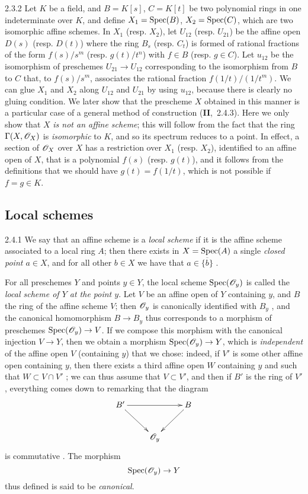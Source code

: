 \documentclass{book}
\begin{document}
\begin{env}[Example]{2.3.2}
\label{exm-1.2.3.2}
Let $K$ be a field, and $B=K[s]$, $C=K[t]$ be two polynomial rings in one indeterminate over $K$,
and define $X_1={\mathop{\mathrm{Spec}}\nolimits}(B)$, $X_2={\mathop{\mathrm{Spec}}\nolimits}(C)$, which are two isomorphic affine schemes.
In $X_1$ (resp. $X_2$), let $U_{12}$ (resp. $U_{21}$) be the affine open $D(s)$ (resp. $D(t)$) where
the ring $B_s$ (resp. $C_t$) is formed of rational fractions of the form $f(s)/s^m$ (resp. $g(t)/t^n$)
with $f\in B$ (resp. $g\in C$). Let $u_{12}$ be the isomorphism of preschemes $U_{21}\to U_{12}$
corresponding  to the isomorphism from $B$ to $C$ that, to $f(s)/s^m$, associates
the rational fraction $f(1/t)/(1/t^m)$. We can glue $X_1$ and $X_2$ along $U_{12}$ and $U_{21}$ by
using $u_{12}$, because there is clearly no gluing condition. We later show that the prescheme $X$
obtained in this manner is a particular case of a general method of construction (\textbf{II},~2.4.3).
Here we only show that $X$ \emph{is not an affine scheme}; this will follow from the fact that the ring
$\Gamma(X,\mathscr{O}_X)$ is \emph{isomorphic} to $K$, and so its spectrum reduces to a point. In effect, a section
of $\mathscr{O}_X$ over $X$ has a restriction over $X_1$ (resp. $X_2$), identified to an affine open of $X$, that
is a polynomial $f(s)$ (resp. $g(t)$), and it follows from the definitions that we should have $g(t)=f(1/t)$,
which is not possible if $f=g\in K$.
\end{env}

\subsection{Local schemes}
\label{1-schemes-2.4}

\begin{env}{2.4.1}
\label{env-1.2.4.1}
We say that an affine scheme is a \emph{local scheme} if
it is the affine scheme associated to a local ring $A$; then there exists in
$X={\mathop{\mathrm{Spec}}\nolimits}(A)$ a single \emph{closed point $a\in X$}, and for all other $b\in X$
we have that $a\in\overline{\{b\}}$ .
\end{env}
    
For all preschemes $Y$ and points $y\in Y$, the local scheme ${\mathop{\mathrm{Spec}}\nolimits}(\mathscr{O}_y)$
is called the \emph{local scheme of $Y$ at the point $y$}. Let $V$ be an affine
open of $Y$ containing $y$, and $B$ the ring of the affine scheme $V$; then
$\mathscr{O}_y$ is canonically identified with $B_y$ , and the canonical
homomorphism $B\to B_y$ thus corresponds  to a morphism of preschemes
${\mathop{\mathrm{Spec}}\nolimits}(\mathscr{O}_y)\to V$.  If we compose this morphism with the canonical injection
$V\to Y$, then we obtain a morphism ${\mathop{\mathrm{Spec}}\nolimits}(\mathscr{O}_y)\to Y$, which is
\emph{independent} of the affine open $V$ (containing $y$) that we chose:
indeed, if $V'$ is some other affine open containing $y$, then there exists a
third affine open $W$ containing $y$ and such that $W\subset V\cap V'$ ;
we can thus assume that $V\subset V'$, and then if $B'$ is the ring of $V'$,
everything comes down to remarking that the diagram
\[
  \xymatrix{
    B'\ar[rr]\ar[dr] & & B\ar[dl]\\
    & \O_y &
  }
\]
is commutative
. The morphism \[ {\mathop{\mathrm{Spec}}\nolimits}(\mathscr{O}_y)\to Y \] thus defined is said
to be \emph{canonical}.
    
\end{document}

